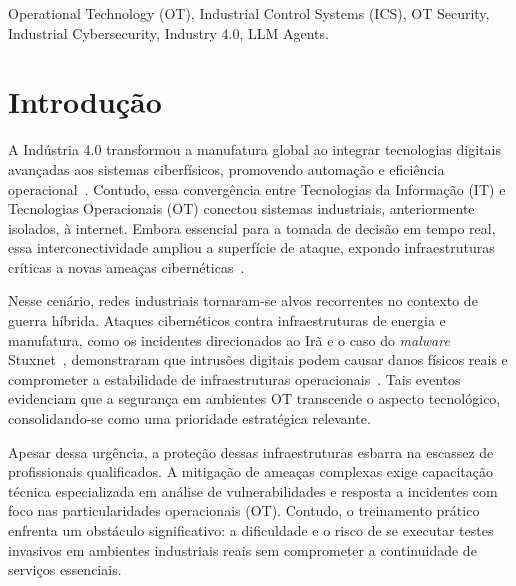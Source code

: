 \documentclass[conference]{IEEEtran}
\begin{document}
\begin{IEEEkeywords}
Operational Technology (OT), Industrial Control Systems (ICS), OT Security, Industrial Cybersecurity, Industry 4.0, LLM Agents.
\end{IEEEkeywords}

\section{Introdução}
\label{sec:intro}
A Indústria 4.0 transformou a manufatura global ao integrar tecnologias digitais avançadas aos sistemas ciberfísicos, promovendo automação e eficiência operacional~\cite{thoben2017industrie}. Contudo, essa convergência entre Tecnologias da Informação (IT) e Tecnologias Operacionais (OT) conectou sistemas industriais, anteriormente isolados, à internet. Embora essencial para a tomada de decisão em tempo real, essa interconectividade ampliou a superfície de ataque, expondo infraestruturas críticas a novas ameaças cibernéticas~\cite{PEREIRA20171253}.

Nesse cenário, redes industriais tornaram-se alvos recorrentes no contexto de guerra híbrida. Ataques cibernéticos contra infraestruturas de energia e manufatura, como os incidentes direcionados ao Irã e o caso do \textit{malware} Stuxnet~\cite{MILLER2021100464}, demonstraram que intrusões digitais podem causar danos físicos reais e comprometer a estabilidade de infraestruturas operacionais~\cite{Dawson20216975}. Tais eventos evidenciam que a segurança em ambientes OT transcende o aspecto tecnológico, consolidando-se como uma prioridade estratégica relevante.

Apesar dessa urgência, a proteção dessas infraestruturas esbarra na escassez de profissionais qualificados. A mitigação de ameaças complexas exige capacitação técnica especializada em análise de vulnerabilidades e resposta a incidentes com foco nas particularidades operacionais (OT). Contudo, o treinamento prático enfrenta um obstáculo significativo: a dificuldade e o risco de se executar testes invasivos em ambientes industriais reais sem comprometer a continuidade de serviços essenciais.
\end{document}

